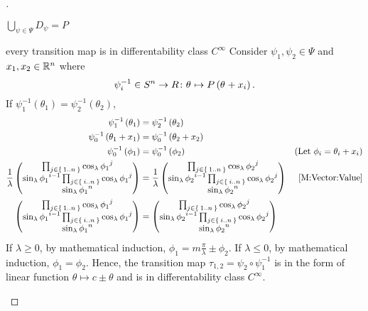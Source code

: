 \documentclass[../main.tex]{subfiles}
\begin{document}
\begin{proof}[]
\begin{subproof}{\(\bigcup_{\psi\in\Psi} D_\psi=P\)}
\end{subproof}
\begin{subproof}{every transition map is in differentability class \(C^\infty\)}
Consider \(\psi_1,\psi_2\in\Psi\) and \(x_1, x_2\in\mathbb{R}^n\) where
\[
\psi_i^{-1}
\in S^n\to R
\colon\tensor{\theta}{}\mapsto P\left(\tensor{\theta}{}+x_i\right)
\text{.}
\]
If \(\psi_1^{-1}\left(\theta_1\right)=\psi_2^{-1}\left(\theta_2\right)\),
\begin{align*}
\psi_1^{-1}\left(\theta_1\right)
&=\psi_2^{-1}\left(\theta_2\right)\\
\psi_0^{-1}\left(\theta_1+x_1\right)
&=\psi_0^{-1}\left(\theta_2+x_2\right)\\
\psi_0^{-1}\left(\phi_1\right)
&=\psi_0^{-1}\left(\phi_2\right)&\text{(Let \(\phi_i =\theta_i+x_i\))}\\
\frac{1}{\lambda}
\begin{pmatrix}
\prod_{j\in\Set{1..n}}{\cos_\lambda{\tensor{{\phi_1}}{^j}}}\\
\sin_\lambda{\tensor{{\phi_1}}{^{i-1}}}\prod_{j\in\Set{i..n}}{\cos_\lambda{\tensor{{\phi_1}}{^j}}}\\
\sin_\lambda{{\tensor{{\phi_1}}{^n}}}\\
\end{pmatrix}
&=
\frac{1}{\lambda}
\begin{pmatrix}
\prod_{j\in\Set{1..n}}{\cos_\lambda{\tensor{{\phi_2}}{^j}}}\\
\sin_\lambda{\tensor{{\phi_2}}{^{i-1}}}\prod_{j\in\Set{i..n}}{\cos_\lambda{\tensor{{\phi_2}}{^j}}}\\
\sin_\lambda{{\tensor{{\phi_2}}{^n}}}\\
\end{pmatrix}&\text{\cref{M:Vector:Value}}\\
\begin{pmatrix}
\prod_{j\in\Set{1..n}}{\cos_\lambda{\tensor{{\phi_1}}{^j}}}\\
\sin_\lambda{\tensor{{\phi_1}}{^{i-1}}}\prod_{j\in\Set{i..n}}{\cos_\lambda{\tensor{{\phi_1}}{^j}}}\\
\sin_\lambda{{\tensor{{\phi_1}}{^n}}}\\
\end{pmatrix}
&=
\begin{pmatrix}
\prod_{j\in\Set{1..n}}{\cos_\lambda{\tensor{{\phi_2}}{^j}}}\\
\sin_\lambda{\tensor{{\phi_2}}{^{i-1}}}\prod_{j\in\Set{i..n}}{\cos_\lambda{\tensor{{\phi_2}}{^j}}}\\
\sin_\lambda{{\tensor{{\phi_2}}{^n}}}\\
\end{pmatrix}
\end{align*}
If \(\lambda\ge 0\), by mathematical induction, \(\phi_1=m\frac{\pi}{\lambda}\pm\phi_2\).
If \(\lambda\le 0\), by mathematical induction, \(\phi_1 =\phi_2\).
Hence, the transition map \(\tau_{1,2} =\psi_2\circ\psi_1^{-1}\)
is in the form of linear function \(\theta\mapsto c\pm\theta\)
and is in differentability class \(C^\infty\).
\end{subproof}
\end{proof}
\end{document}
